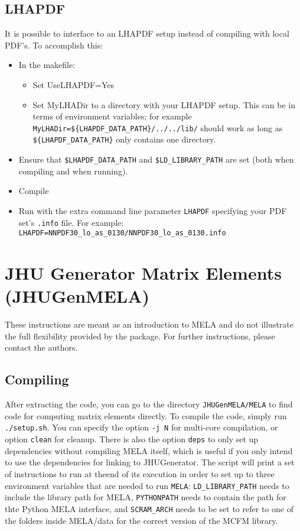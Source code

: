 \documentclass[aps,superscriptaddress,nofootinbib]{revtex4}
\begin{document}
\subsection{LHAPDF}
\label{sec:LHAPDF}
It is possible to interface to an LHAPDF setup instead of compiling with local PDF's.  To accomplish this:
\begin{itemize}
\item In the makefile:
\begin{itemize}
\item Set UseLHAPDF=Yes
\item Set MyLHADir to a directory with your LHAPDF setup.  This can be in terms of environment variables; for example \verb|MyLHADir=${LHAPDF_DATA_PATH}/../../lib/| should work as long as \verb|${LHAPDF_DATA_PATH}| only contains one directory.
\end{itemize}
\item Ensure that \verb|$LHAPDF_DATA_PATH| and \verb|$LD_LIBRARY_PATH| are set (both when compiling and when running).
\item Compile
\item Run with the extra command line parameter \verb|LHAPDF| specifying your PDF set's \verb|.info| file.  For example: \verb|LHAPDF=NNPDF30_lo_as_0130/NNPDF30_lo_as_0130.info|
\end{itemize}
\section{JHU Generator Matrix Elements (JHUGenMELA)}
These instructions are meant as an introduction to MELA and do not illustrate the full flexibility provided by the package.  For further instructions, please contact the authors.
\subsection{Compiling}
After extracting the code, you can go to the directory \texttt{JHUGenMELA/MELA} to find code for computing matrix elements directly.
To compile the code, simply run \texttt{./setup.sh}. You can specify the option \verb|-j N| for multi-core compilation, or option \verb|clean| for cleanup. There is also the option \verb|deps| to only set up dependencies without compiling MELA itself, which is useful if you only intend to use the dependencies for linking to JHUGenerator. The script will print a set of instructions to run at theend of its execution in order to set up to three environment variables that are needed to run \texttt{MELA}: \texttt{LD\_LIBRARY\_PATH} needs to include the library path for MELA, \texttt{PYTHONPATH} needs to contain the path for thte Python MELA interface, and \texttt{SCRAM\_ARCH} needs to be set to refer to one of the folders inside MELA/data for the correct version of the MCFM library.
\end{document}
